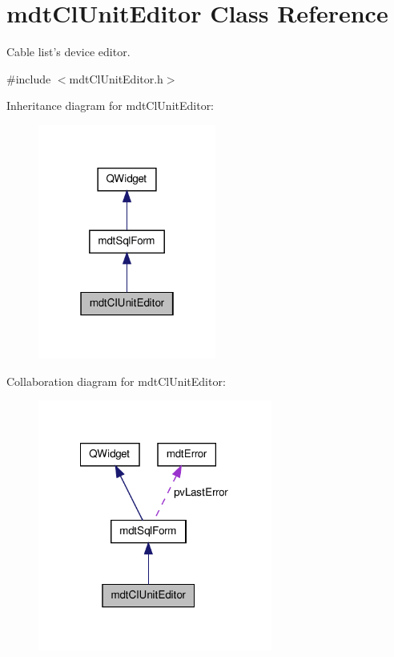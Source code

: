 \hypertarget{classmdt_cl_unit_editor}{\section{mdt\-Cl\-Unit\-Editor Class Reference}
\label{classmdt_cl_unit_editor}
}


Cable list's device editor.  




{\ttfamily \#include $<$mdt\-Cl\-Unit\-Editor.\-h$>$}



Inheritance diagram for mdt\-Cl\-Unit\-Editor\-:\nopagebreak
\begin{figure}[H]
\begin{center}
\leavevmode
\includegraphics[width=166pt]{classmdt_cl_unit_editor__inherit__graph}
\end{center}
\end{figure}


Collaboration diagram for mdt\-Cl\-Unit\-Editor\-:\nopagebreak
\begin{figure}[H]
\begin{center}
\leavevmode
\includegraphics[width=218pt]{classmdt_cl_unit_editor__coll__graph}
\end{center}
\end{figure}
